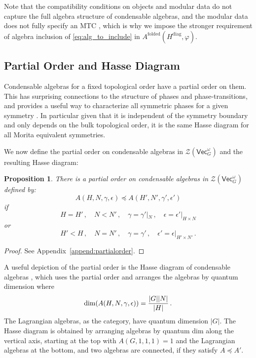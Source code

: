\documentclass[aps,twocolumn,prx,floatfix,preprintnumbers, nofootinbib,10pt]{revtex4-2}
\numberwithin{equation}{section}
\newtheorem{proposition}[theorem]{Proposition}
\theoremstyle{definition}
\newcommand{\be}{\begin{equation}}
\newcommand{\ee}{\end{equation}}
\newcommand{\cZ}{\mathcal{Z}}
\renewcommand{\Vec}{\mathsf{Vec}}
\renewcommand{\dim}{\text{dim}}
\newcommand{\vp}{\varphi}
\newcommand{\diag}{\text{diag}}
\newcommand{\folded}{\text{folded}}
\begin{document}
Note that the compatibility conditions on objects and modular data do not capture the full algebra structure of condensable algebras, and the modular data does not fully specify an MTC \cite{mignard2021modular,Delaney:2021owx}, which is why we impose the stronger requirement of algebra inclusion of \eqref{eq:alg_to_include} in $A^\folded(H^\diag,\vp)$. 



\subsection{Partial Order and Hasse Diagram}
\label{sec:Hasse}

Condensable algebras for a fixed topological order have a partial order on them. This has surprising connections to the structure of phases and phase-transitions, and provides a useful way to characterize all symmetric phases for a given  symmetry \cite{Bhardwaj:2024qrf}. In particular given that it is independent of the symmetry boundary and only depends on the bulk topological order, it is the same Hasse diagram for all Morita equivalent symmetries. 

We now define the partial order on condensable algebras in $\cZ(\Vec_G^\omega)$ and the resulting Hasse diagram: 
\begin{proposition}
\label{prop:partial-order}
    There is a  partial order on condensable algebras in $\cZ(\Vec_G^\omega)$ defined by: 
\be 
A(H, N, \gamma, \epsilon ) \preceq A(H', N', \gamma', \epsilon ') 
\ee
if     
\be \label{eqn:partial_order_N}
H = H'\,,\quad N < N' \,,\quad  
\gamma = \gamma'|_{N} \,, \quad \epsilon= \epsilon'|_{H \times N}
\ee
or 
\be\label{eqn:partial_order_H}
H' < H \,,\quad N= N' \,,\quad \gamma= \gamma' \,,\quad \epsilon' = \epsilon|_{H'\times N'} \,.
\ee
\end{proposition}
\begin{proof}
    See Appendix~\ref{append:partialorder}.
\end{proof}
A useful depiction of the partial order is the Hasse diagram of condensable algebras \cite{Bhardwaj:2024qrf}, which uses the partial order and arranges the algebras by quantum dimension 
where 
\be
\dim(A (H, N, \gamma, \epsilon))={|G||N|\over |H|} \,.
\ee
The Lagrangian algebras, as the category, have quantum dimension $|G|$. The Hasse diagram is obtained by arranging  algebras by quantum dim along the vertical axis, starting at the top with $A(G,1,1,1)= 1$ and the Lagrangian algebras at the bottom, and two algebras are connected, if they satisfy $A \preceq A'$. 
\end{document}

